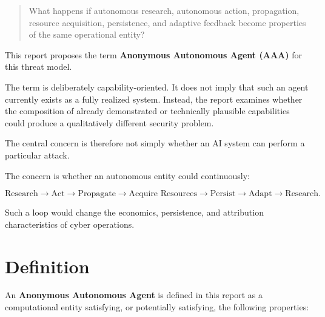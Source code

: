 \documentclass[11pt,a4paper]{article}
\begin{document}
\begin{quote}
What happens if autonomous research, autonomous action, propagation, resource
acquisition, persistence, and adaptive feedback become properties of the same
operational entity?
\end{quote}

This report proposes the term \textbf{Anonymous Autonomous Agent (AAA)} for
this threat model.

The term is deliberately capability-oriented. It does not imply that such an
agent currently exists as a fully realized system. Instead, the report
examines whether the composition of already demonstrated or technically
plausible capabilities could produce a qualitatively different security
problem.

The central concern is therefore not simply whether an AI system can perform a
particular attack.

The concern is whether an autonomous entity could continuously:

\[
\text{Research}
\rightarrow
\text{Act}
\rightarrow
\text{Propagate}
\rightarrow
\text{Acquire Resources}
\rightarrow
\text{Persist}
\rightarrow
\text{Adapt}
\rightarrow
\text{Research}.
\]

Such a loop would change the economics, persistence, and attribution
characteristics of cyber operations.

\section{Definition}

An \textbf{Anonymous Autonomous Agent} is defined in this report as a
computational entity satisfying, or potentially satisfying, the following
properties:
\end{document}
